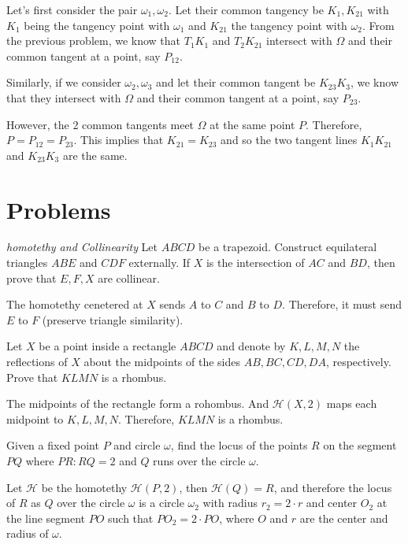 \documentclass[11pt,twoside]{scrartcl}
\begin{document}
    Let's first consider the pair $\omega_1, \omega_2$. Let their common tangency be $K_1, K_{21}$ with $K_1$ being the tangency point with $\omega_1$ and $K_{21}$  the tangency point with $\omega_2$. From the previous problem, we know that $T_1K_1$ and $T_2K_{21}$ intersect with $\Omega$ and their common tangent at a point, say $P_{12}$.

    Similarly, if we consider $\omega_2, \omega_3$ and let their common tangent be $K_{23}K_3$, we know that they intersect with $\Omega$ and their common tangent at a point, say $P_{23}$.

    However, the 2 common tangents meet $\Omega$ at the same point $P$. Therefore, $P = P_{12} = P_{23}$. This implies that $K_{21} = K_{23}$ and so the two tangent lines $K_1K_{21}$ and $K_{23}K_3$ are the same.

\clearpage
\section{Problems}
\begin{problem}
    \textit{homotethy and Collinearity} Let $ABCD$ be a trapezoid. Construct equilateral triangles $ABE$ and $CDF$ externally. If $X$ is the intersection of $AC$ and $BD$, then prove that $E, F, X$ are collinear.
    \begin{sketch}
        The homotethy cenetered at $X$ sends $A$ to $C$ and $B$ to $D$. Therefore, it must send $E$ to $F$ (preserve triangle similarity). 
    \end{sketch}
\end{problem}

\begin{problem}
    Let $X$ be a point inside a rectangle $ABCD$ and denote by $K, L, M, N$ the reflections of $X$ about the midpoints of the sides $AB, BC, CD, DA$, respectively. Prove that $KLMN$ is a rhombus.
    \begin{sketch}
        The midpoints of the rectangle form a rohombus. And $\mathcal{H}(X, 2)$ maps each midpoint to $K, L, M, N$. Therefore, $KLMN$ is a rhombus.
    \end{sketch}
\end{problem}

\begin{problem}
    Given a fixed point $P$ and circle $\omega$, find the locus of the points $R$ on the segment $PQ$ where $PR:RQ = 2$ and $Q$ runs over the circle $\omega$.
    \begin{sketch}
        Let $\mathcal{H}$ be the homotethy $\mathcal{H}(P, 2)$, then $\mathcal{H}(Q) = R$, and therefore the locus of $R$ as $Q$ over the circle $\omega$ is a circle $\omega_2$ with radius $r_2 = 2\cdot r$ and center $O_2$ at the line segment $PO$ such that $PO_2 = 2 \cdot PO$, where $O$ and $r$ are the center and radius of $\omega$. 
    \end{sketch}
\end{problem}
\end{document}
